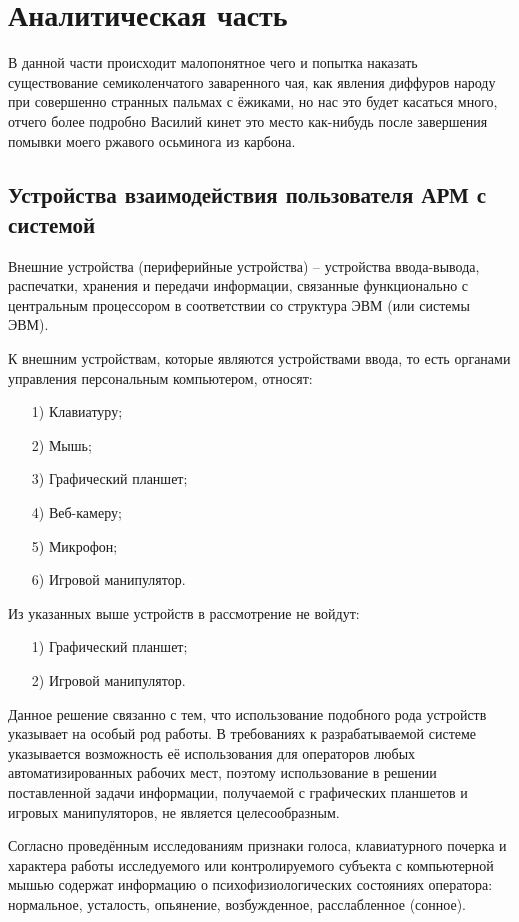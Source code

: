 \section{Аналитическая часть}

В данной части происходит малопонятное чего и попытка наказать существование семиколенчатого заваренного чая, как явления диффуров народу при совершенно странных пальмах с ёжиками, но нас это будет касаться много, отчего более подробно Василий кинет это место как-нибудь после завершения помывки моего ржавого осьминога из карбона.

\subsection{Устройства взаимодействия пользователя АРМ с системой}
Внешние устройства (периферийные устройства) -- устройства ввода-вывода, распечатки, хранения и передачи информации, связанные функционально с центральным процессором в соответствии со структура ЭВМ (или системы ЭВМ). \cite{encDic}

К внешним устройствам, которые являются устройствами ввода, то есть органами управления персональным компьютером, относят:
\begin{itemize}[leftmargin=1.6\parindent]
\item[1)] Клавиатуру;
\item[2)] Мышь;
\item[3)] Графический планшет;
\item[4)] Веб-камеру;
\item[5)] Микрофон;
\item[6)] Игровой манипулятор.
\end{itemize}

Из указанных выше устройств в рассмотрение не войдут:
\begin{itemize}[leftmargin=1.6\parindent]
\item[1)] Графический планшет;
\item[2)] Игровой манипулятор.
\end{itemize}

Данное решение связанно с тем, что использование подобного рода устройств указывает на особый род работы. В требованиях к разрабатываемой системе указывается возможность её использования для операторов любых автоматизированных рабочих мест, поэтому использование в решении поставленной задачи информации, получаемой с графических планшетов и игровых манипуляторов, не является целесообразным.

Согласно проведённым исследованиям \cite{recognitionOfPsycho} признаки голоса, клавиатурного почерка и характера работы исследуемого или контролируемого субъекта с компьютерной мышью содержат информацию о психофизиологических состояниях оператора: нормальное, усталость, опьянение, возбужденное, расслабленное (сонное).

